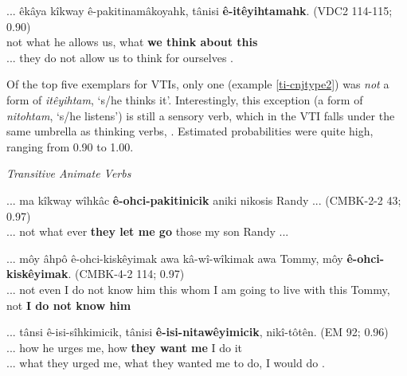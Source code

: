     \begin{exe}
    \ex
    \gll ... êkâya kîkway ê-pakitinamâkoyahk, tânisi \textbf{ê-itêyihtamahk}. \tiny{(VDC2 114-115; 0.90)} \\
      not what {he allows us}, what {\textbf{we think about this}} \\
    \trans ... they do not allow us to think for ourselves \tiny{\citep[42-43]{VandallDouquette1987}}.
    \label{ti-cnjtype5}
    \end{exe}
    
Of the top five exemplars for VTIs, only one (example \ref{ti-cnjtype2}) was \textit{not} a form of \textit{itêyihtam}, `s/he thinks it'. Interestingly, this exception (a form of \textit{nitohtam}, `s/he listens') is still a sensory verb, which in the VTI falls under the same umbrella as thinking verbs, . Estimated probabilities were quite high, ranging from 0.90 to 1.00.
    
\vspace{5mm}
    \textit{Transitive Animate Verbs}
    
    \begin{exe}
    \ex
    \gll ... ma kîkway wîhkâc \textbf{ê-ohci-pakitinicik} aniki nikosis Randy ... \tiny{(CMBK-2-2 43; 0.97)} \\
    ... not what ever {\textbf{they let me go}} those {my son} Randy ... \\
    \trans 
    \label{ta-cnjtype1}
    \end{exe}
    
    \begin{exe}
    \ex
    \gll ... môy âhpô ê-ohci-kiskêyimak awa kâ-wî-wîkimak awa Tommy, môy \textbf{ê-ohci-kiskêyimak}. \tiny{(CMBK-4-2 114; 0.97)} \\
     ... not even {I do not know him} this {whom I am going to live with} this Tommy, not {\textbf{I do not know him}}\\
    \trans  
    \label{ta-cnjtype2}
    \end{exe}
    
    \begin{exe}
    \ex
    \gll ... tânsi ê-isi-sîhkimicik, tânisi \textbf{ê-isi-nitawêyimicik}, nikî-tôtên. \tiny{(EM 92; 0.96)} \\
    ... how {he urges me}, how \textbf{{they want me}} {I do it}\\
    \trans ... what they urged me, what they wanted me to do, I would do \tiny{\citep[66-67]{Minde1997kwayask}}.
    \label{ta-cnjtype3}
    \end{exe}
    
